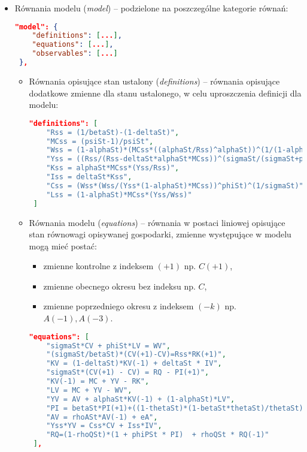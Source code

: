 \begin{itemize}
    \item Równania modelu (\emph{model}) -- podzielone na poszczególne kategorie równań:
    \begin{lstlisting}[language=json,firstnumber=5]
 "model": {
    "definitions": [...],
    "equations": [...],
    "observables": [...]
 },
    \end{lstlisting}
        \begin{itemize}
            \item Równania opisujące stan ustalony (\emph{definitions}) -- równania opisujące dodatkowe zmienne dla stanu ustalonego, w celu uproszczenia definicji dla modelu:
            \begin{lstlisting}[language=json,firstnumber=6]
 "definitions": [
    "Rss = (1/betaSt)-(1-deltaSt)",
    "MCss = (psiSt-1)/psiSt",
    "Wss = (1-alphaSt)*(MCss*((alphaSt/Rss)^alphaSt))^(1/(1-alphaSt))",
    "Yss = ((Rss/(Rss-deltaSt*alphaSt*MCss))^(sigmaSt/(sigmaSt+phiSt)))*((Wss)*(Wss/((1-alphaSt)*MCss))^phiSt)^(1/(sigmaSt+phiSt))",
    "Kss = alphaSt*MCss*(Yss/Rss)",
    "Iss = deltaSt*Kss",
    "Css = (Wss*(Wss/(Yss*(1-alphaSt)*MCss))^phiSt)^(1/sigmaSt)",
    "Lss = (1-alphaSt)*MCss*(Yss/Wss)"
 ]
            \end{lstlisting}
            \item Równania modelu (\emph{equations}) -- równania w postaci liniowej opisujące stan równowagi opisywanej gospodarki, zmienne występujące w modelu mogą mieć postać:
            \begin{itemize}
                \item zmienne kontrolne z indeksem $(+1)$ np. $C(+1)$,
                \item zmienne obecnego okresu bez indeksu np. $C$,
                \item zmienne poprzedniego okresu z indeksem $(-k)$ np. $A(-1), A(-3)$.
            \end{itemize}
            \begin{lstlisting}[language=json,firstnumber=16]
 "equations": [
    "sigmaSt*CV + phiSt*LV = WV",
    "(sigmaSt/betaSt)*(CV(+1)-CV)=Rss*RK(+1)",
    "KV = (1-deltaSt)*KV(-1) + deltaSt * IV",
    "sigmaSt*(CV(+1) - CV) = RQ - PI(+1)",
    "KV(-1) = MC + YV - RK",
    "LV = MC + YV - WV",
    "YV = AV + alphaSt*KV(-1) + (1-alphaSt)*LV",
    "PI = betaSt*PI(+1)+((1-thetaSt)*(1-betaSt*thetaSt)/thetaSt)*MC",
    "AV = rhoASt*AV(-1) + eA",
    "Yss*YV = Css*CV + Iss*IV",
    "RQ=(1-rhoQSt)*(1 + phiPSt * PI)  + rhoQSt * RQ(-1)"
 ],
            \end{lstlisting}
            

\end{itemize}
\end{itemize}
